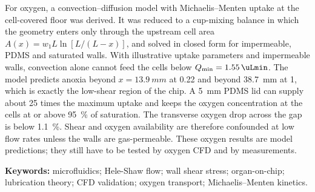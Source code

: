 For oxygen, a convection--diffusion model with Michaelis--Menten uptake at the cell-covered floor was derived. It was reduced to a cup-mixing balance in which the geometry enters only through the upstream cell area $A(x)=w_1L\ln[L/(L-x)]$, and solved in closed form for impermeable, PDMS and saturated walls. With illustrative uptake parameters and impermeable walls, convection alone cannot feed the cells below $Q_{\min}=\SI{1.55}{\uLmin}$. The model predicts anoxia beyond $x=\SI{13.9}{mm}$ at \SI{0.22}{\uLmin} and beyond \SI{38.7}{mm} at \SI{1}{\uLmin}, which is exactly the low-shear region of the chip. A \SI{5}{mm} PDMS lid can supply about 25 times the maximum uptake and keeps the oxygen concentration at the cells at or above \SI{95}{\percent} of saturation. The transverse oxygen drop across the gap is below \SI{1.1}{\percent}. Shear and oxygen availability are therefore confounded at low flow rates unless the walls are gas-permeable. These oxygen results are model predictions; they still have to be tested by oxygen CFD and by measurements.

\vspace{3mm}
\noindent\textbf{Keywords:} microfluidics; Hele-Shaw flow; wall shear stress; organ-on-chip; lubrication theory; CFD validation; oxygen transport; Michaelis--Menten kinetics.
